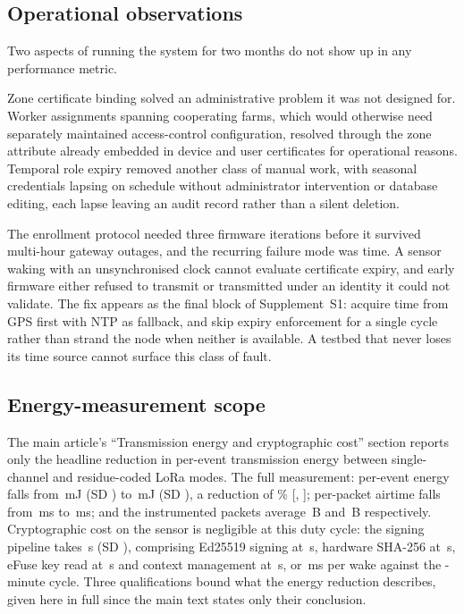 \subsection{Operational observations}
\label{subsec:operational}

Two aspects of running the system for two months do not show up in any
performance metric.

Zone certificate binding solved an administrative problem it was not designed
for. Worker assignments spanning cooperating farms, which would otherwise
need separately maintained access-control configuration, resolved through the
zone attribute already embedded in device and user certificates for
operational reasons. Temporal role expiry removed another class of manual
work, with seasonal credentials lapsing on schedule without administrator
intervention or database editing, each lapse leaving an audit record rather
than a silent deletion.

The enrollment protocol needed three firmware iterations before it survived
multi-hour gateway outages, and the recurring failure mode was time. A sensor
waking with an unsynchronised clock cannot evaluate certificate expiry, and
early firmware either refused to transmit or transmitted under an identity it
could not validate. The fix appears as the final block of
Supplement~S1: acquire time from GPS first with NTP as fallback,
and skip expiry enforcement for a single cycle rather than strand the node
when neither is available. A testbed that never loses its time source cannot
surface this class of fault.

\subsection{Energy-measurement scope}
\label{subsec:energy_detail}

The main article's ``Transmission energy and cryptographic cost'' section
reports only the headline reduction in per-event transmission energy
between single-channel and residue-coded LoRa modes. The full measurement:
per-event energy falls from \EnergySingle\,mJ (SD \EnergySingleSD) to
\EnergyCRT\,mJ (SD \EnergyCRTSD), a reduction of \EnergyReductionPct\%
[\EnergyReductionCILow, \EnergyReductionCIHigh]; per-packet airtime falls
from \AirtimeSingle\,ms to \AirtimeCRT\,ms; and the instrumented packets
average \PayloadSingle\,B and \PayloadCRT\,B respectively. Cryptographic
cost on the sensor is negligible at this duty cycle: the signing pipeline
takes \SignTotal\,\textmu{}s (SD \SignTotalSD), comprising Ed25519 signing
at \SignEdDSA\,\textmu{}s, hardware SHA-256 at \SignSHA\,\textmu{}s, eFuse
key read at \SignEfuse\,\textmu{}s and context management at
\SignContext\,\textmu{}s, or \SignMilli\,ms per wake against the
\DutyCycleMinutes-minute cycle. Three qualifications bound what the energy
reduction describes, given here in full since the main text states only
their conclusion.

